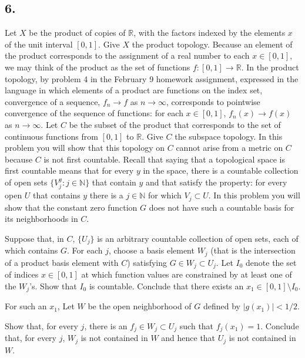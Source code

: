 \documentclass{amsart}
\theoremstyle{plain}
\theoremstyle{definition}
\theoremstyle{remark}
\begin{document}
\vspace{.15in}
\noindent
\subsection*{6.} Let $X$ be the product of copies of $\mathbb R$, with the factors indexed by the elements $x$ of the unit interval $[0,1]$. Give $X$ the product topology. Because an element of the product corresponds to the assignment of a real number to each $x\in[0,1]$, we may think of the product as the set of functions $f : [0,1] \rightarrow \mathbb R$. In the product topology, by problem 4 in the February 9 homework assignment, expressed in the language in which elements of a product are functions on the index set, convergence of a sequence, $f_n \rightarrow f$ as $n\rightarrow \infty$, corresponds to pointwise convergence of the sequence of functions: for each $x\in [0,1]$, $f_n(x) \rightarrow f(x)$ as $n\rightarrow \infty$. Let $C $ be the subset of the product that corresponds to the set of continuous functions from $[0,1]$ to $\mathbb R$. Give $C$ the subspace topology. In this problem you will show that this topology on $C$ cannot arise from a metric on $C$ because $C$ is not first countable. Recall that saying that a topological space is first countable means that for every $y$ in the space, there is a countable collection of open sets $\{ V_j^y : j\in \mathbb N \}$ that contain $y$ and that satisfy the property: for 
every open $U$ that contains $y$ there is a $j\in \mathbb N$ for which $V_j \subset U$. In this problem you will show that the constant zero function $G$ does not have such a countable basis for its neighborhoods in $C$.

Suppose that, in $C$, $\{ U_j\}$ is an arbitrary countable collection of open sets, each of which contains $G$. For each $j$, choose a basis element $W_j$ (that is the intersection of a product basis element with $C$) satisfying $G\in W_j\subset U_j$. Let $I_0$ denote the set of indices $x\in [0,1]$ at which function values are constrained by at least one of the $W_j$'s. Show that $I_0$ is countable. Conclude that there exists an $x_1 \in [0,1] \setminus I_0$. 

For such an $x_1$, Let $W$ be the open neighborhood of $G$ defined by $|g(x_1)| < 1/2$. 

Show that, for every $j$, there is an $f_j \in W_j\subset U_j$ such that $f_j(x_1) = 1$. Conclude that, for every $j$, $W_j$ is not contained in $W$ and hence that $U_j$ is not contained in $W$.  







 
\end{document}
